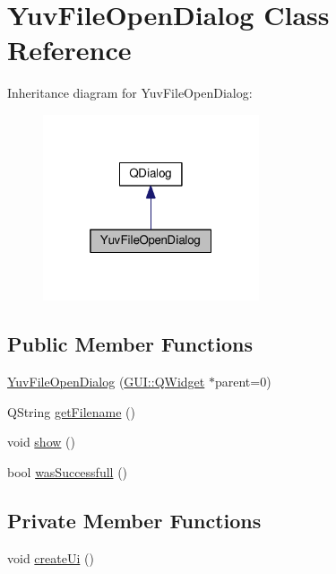 \hypertarget{classGUI_1_1YuvFileOpenDialog}{}\section{Yuv\+File\+Open\+Dialog Class Reference}
\label{classGUI_1_1YuvFileOpenDialog}


Inheritance diagram for Yuv\+File\+Open\+Dialog\+:
\nopagebreak
\begin{figure}[H]
\begin{center}
\leavevmode
\includegraphics[width=181pt]{classGUI_1_1YuvFileOpenDialog__inherit__graph}
\end{center}
\end{figure}
\subsection*{Public Member Functions}
\begin{DoxyCompactItemize}
\item 
\hyperlink{classGUI_1_1YuvFileOpenDialog_a57116172c45546098db5137962d75267}{Yuv\+File\+Open\+Dialog} (\hyperlink{classGUI_1_1QWidget}{G\+U\+I\+::\+Q\+Widget} $\ast$parent=0)
\item 
Q\+String \hyperlink{classGUI_1_1YuvFileOpenDialog_a4cab0482a28655db427c3347d9c6f123}{get\+Filename} ()
\item 
void \hyperlink{classGUI_1_1YuvFileOpenDialog_a4b148f40a95444d5669406b918ad2f52}{show} ()
\item 
bool \hyperlink{classGUI_1_1YuvFileOpenDialog_a5fe30d3272be7974b9b2f48da27a097f}{was\+Successfull} ()
\end{DoxyCompactItemize}
\subsection*{Private Member Functions}
\begin{DoxyCompactItemize}
\item 
void \hyperlink{classGUI_1_1YuvFileOpenDialog_aa72182c9a958af0e87b65ab7bdba0035}{create\+Ui} ()
\end{DoxyCompactItemize}
